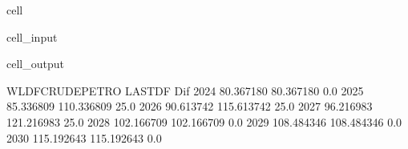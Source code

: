 \documentclass[letterpaper,10pt,english]{jupyterBook}
\begin{document}
\begin{sphinxuseclass}{cell}\begin{sphinxVerbatimInput}

\begin{sphinxuseclass}{cell_input}
\begin{sphinxVerbatim}[commandchars=\\\{\}]

\PYG{p}{[}\PYG{p}{[}\PYG{p}{]}\PYG{p}{]}
\PYG{p}{[}\PYG{p}{]}\PYG{p}{[}\PYG{p}{[}\PYG{p}{]}\PYG{p}{]}
\PYG{p}{[}\PYG{p}{]}\PYG{p}{[}\PYG{p}{]}\PYG{p}{[}\PYG{p}{]}

\PYG{p}{[}\PYG{p}{]}
\end{sphinxVerbatim}

\end{sphinxuseclass}\end{sphinxVerbatimInput}
\begin{sphinxVerbatimOutput}

\begin{sphinxuseclass}{cell_output}
\begin{sphinxVerbatim}[commandchars=\\\{\}]
      WLDFCRUDE\PYGZus{}PETRO      LASTDF   Dif
2024        80.367180   80.367180   0.0
2025        85.336809  110.336809  25.0
2026        90.613742  115.613742  25.0
2027        96.216983  121.216983  25.0
2028       102.166709  102.166709   0.0
2029       108.484346  108.484346   0.0
2030       115.192643  115.192643   0.0
\end{sphinxVerbatim}

\end{sphinxuseclass}\end{sphinxVerbatimOutput}

\end{sphinxuseclass}
\end{document}
